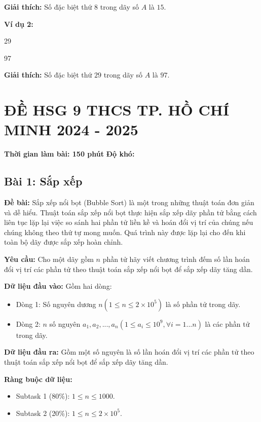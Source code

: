 \documentclass[12pt]{scrartcl}  %
\begin{document}
\textbf{Giải thích:}
Số đặc biệt thứ $8$ trong dãy số $A$ là $15$.

\textbf{Ví dụ 2:}

\begin{tcolorbox}[colback=gray!5!white, colframe=blue!50!black, title=Input]
29
\end{tcolorbox}

\begin{tcolorbox}[colback=gray!5!white, colframe=green!50!black, title=Output]
97
\end{tcolorbox}

\textbf{Giải thích:}
Số đặc biệt thứ $29$ trong dãy số $A$ là $97$.

\section{ĐỀ HSG 9 THCS TP. HỒ CHÍ MINH 2024 - 2025}
\textbf{Thời gian làm bài: 150 phút}
\textbf{Độ khó: }

\subsection{Bài 1: Sắp xếp}
\textbf{Đề bài:}
Sắp xếp nổi bọt (Bubble Sort) là một trong những thuật toán đơn giản và dễ hiểu. Thuật toán sắp xếp nổi bọt 
thực hiện sắp xếp dãy phần tử bằng cách liên tục lặp lại việc so sánh hai phần tử liền kề và hoán đổi vị trí của chúng
nếu chúng không theo thứ tự mong muốn. Quá trình này được lặp lại cho đến khi toàn bộ dãy được sắp xếp hoàn chỉnh.

\textbf{Yêu cầu:}
Cho một dãy gồm $n$ phần tử hãy viết chương trình đếm số lần hoán đổi vị trí các phần tử theo thuật toán sắp xếp nổi bọt để sắp xếp dãy tăng dần. 

\textbf{Dữ liệu đầu vào:}
Gồm hai dòng:
\begin{itemize}
    \item Dòng 1: Số nguyên dương $n (1 \leq n \leq 2 \times 10^5)$ là số phần tử trong dãy.
    \item Dòng 2: $n$ số nguyên $a_1, a_2, ..., a_n (1 \leq a_i \leq 10^9, \forall i = 1 ... n)$ là các phần tử trong dãy.
\end{itemize}

\textbf{Dữ liệu đầu ra:}
Gồm một số nguyên là số lần hoán đổi vị trí các phần tử theo thuật toán sắp xếp nổi bọt để sắp xếp dãy tăng dần.

\textbf{Ràng buộc dữ liệu:}
\begin{itemize}
    \item Subtask 1 (80\%): $1 \leq n \leq 1000$.
    \item Subtask 2 (20\%): $1 \leq n \leq 2 \times 10^5$.
\end{itemize}
\end{document}

